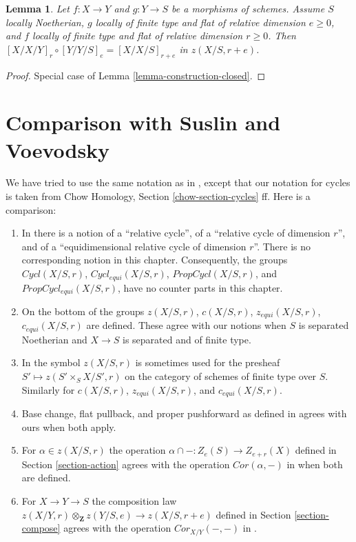 \documentclass{stacks-project}
\theoremstyle{plain}
\newtheorem{lemma}[subsection]{Lemma}
\theoremstyle{definition}
\theoremstyle{remark}
\numberwithin{equation}{subsection}
\begin{document}
\begin{lemma}
\label{lemma-composition-fundamental-cycles}
Let $f : X \to Y$ and $g : Y \to S$ be a morphisms of schemes.
Assume $S$ locally Noetherian, $g$ locally of finite type and
flat of relative dimension $e \ge 0$, and $f$ locally of finite type
and flat of relative dimension $r \geq 0$. Then
$[X/X/Y]_r \circ [Y/Y/S]_e = [X/X/S]_{r + e}$ in $z(X/S, r + e)$.
\end{lemma}

\begin{proof}
Special case of Lemma \ref{lemma-construction-closed}.
\end{proof}






\section{Comparison with Suslin and Voevodsky}
\label{section-compare}

\noindent
We have tried to use the same notation as in \cite{SV}, except that
our notation for cycles is taken from
Chow Homology, Section \ref{chow-section-cycles} ff.
Here is a comparison:
\begin{enumerate}
\item In \cite[Section 3.1]{SV} there is a notion of a
``relative cycle'', of a ``relative cycle of dimension $r$'', and
of a ``equidimensional relative cycle of dimension $r$''.
There is no corresponding notion in this chapter. Consequently, the groups
$Cycl(X/S, r)$, $Cycl_{equi}(X/S, r)$,
$PropCycl(X/S, r)$, and $PropCycl_{equi}(X/S, r)$,
have no counter parts in this chapter.
\item On the bottom of \cite[page 36]{SV} the groups
$z(X/S, r)$, $c(X/S, r)$, $z_{equi}(X/S, r)$, $c_{equi}(X/S, r)$
are defined. These agree with our notions when $S$ is separated
Noetherian and $X \to S$ is separated and of finite type.
\item In \cite{SV} the symbol $z(X/S, r)$ is sometimes used for the
presheaf $S' \mapsto z(S' \times_S X/S', r)$ on the category of schemes
of finite type over $S$. Similarly for
$c(X/S, r)$, $z_{equi}(X/S, r)$, and $c_{equi}(X/S, r)$.
\item Base change, flat pullback, and proper pushforward
as defined in \cite{SV} agrees with ours when both apply.
\item For $\alpha \in z(X/S, r)$ the operation
$\alpha \cap - : Z_e(S) \to Z_{e + r}(X)$ defined in
Section \ref{section-action} agrees with
the operation $Cor(\alpha, -)$ in \cite[Section 3.7]{SV}
when both are defined.
\item For $X \to Y \to S$ the composition law
$z(X/Y, r) \otimes_\mathbf{Z} z(Y/S, e) \longrightarrow z(X/S, r + e)$
defined in Section \ref{section-compose}
agrees with the operation $Cor_{X/Y}(-, -)$ in
\cite[Corollary 3.7.5]{SV}.
\end{enumerate}
\end{document}
